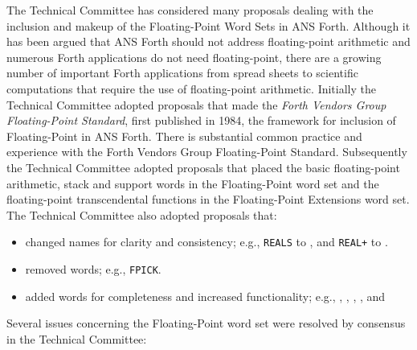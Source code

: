 The Technical Committee has considered many proposals dealing with
the inclusion and makeup of the Floating-Point Word Sets in ANS
Forth. Although it has been argued that ANS Forth should not address
floating-point arithmetic and numerous Forth applications do not need
floating-point, there are a growing number of important Forth
applications from spread sheets to scientific computations that
require the use of floating-point arithmetic. Initially the Technical
Committee adopted proposals that made the \emph{Forth Vendors Group
Floating-Point Standard}, first published in 1984, the framework for
inclusion of Floating-Point in ANS Forth. There is substantial common
practice and experience with the Forth Vendors Group Floating-Point
Standard.  Subsequently the Technical Committee adopted proposals that
placed the basic floating-point arithmetic, stack and support words
in the Floating-Point word set and the floating-point transcendental
functions in the Floating-Point Extensions word set. The Technical
Committee also adopted proposals that:

\begin{itemize}
\item changed names for clarity and consistency; e.g.,
	\texttt{REALS} to , and
	\texttt{REAL+} to .
\item removed words; e.g., \texttt{FPICK}.
\item added words for completeness and increased functionality; e.g.,
	,
	,
	,
	,
	 and
\end{itemize}

Several issues concerning the Floating-Point word set were resolved
by consensus in the Technical Committee:

